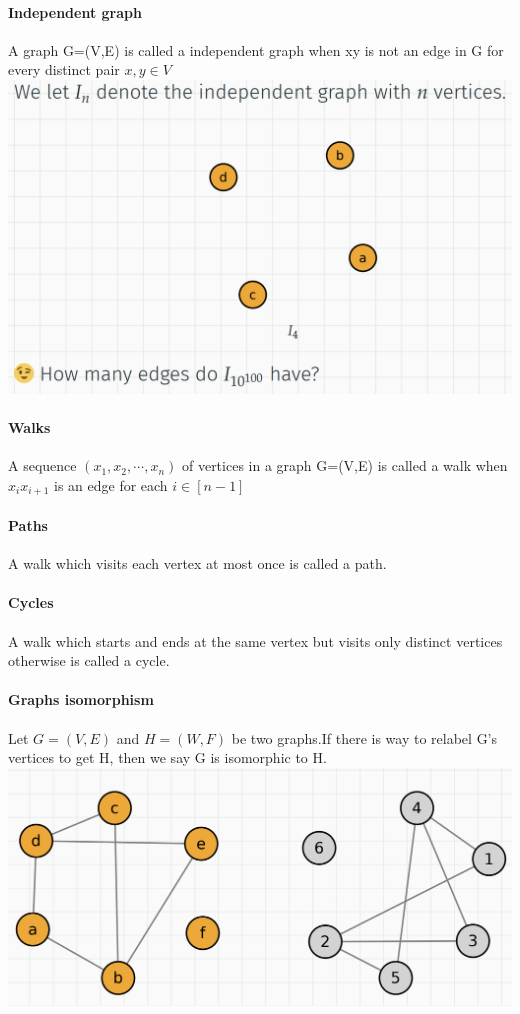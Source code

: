 \documentclass{article}
\begin{document}
\paragraph{Independent graph}
A graph G=(V,E) is called a independent graph when xy is not an edge in G for every distinct pair $x,y\in V$\newline
\includegraphics{0029}
\paragraph{Walks} A sequence $(x_1,x_2,\cdots,x_n)$ of vertices in a graph G=(V,E) is called a walk when $x_ix_{i+1}$ is an edge for each $i\in [n-1]$\newline

\paragraph{Paths}
A walk which visits each vertex at most once is called a path.
\paragraph{Cycles}
A walk which starts and ends at the same vertex but visits only distinct vertices otherwise is called a cycle.
\paragraph{Graphs isomorphism}
Let $G=(V,E)$ and $H=(W,F)$ be two graphs.If there is way to relabel G's vertices to get H, then we say G is isomorphic to H.\newline
\includegraphics{0030}
\end{document}
